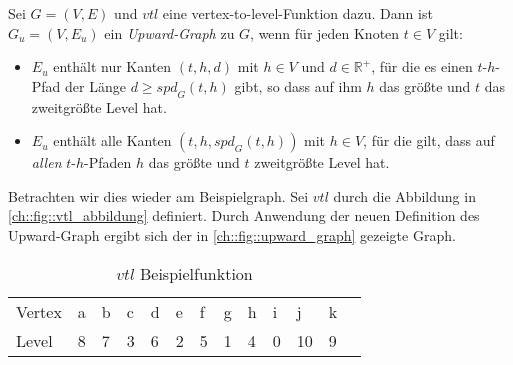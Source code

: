 \begin{definition}\label{people:def:upward_graph}
  Sei $G = (V, E)$ und ${vtl}$ eine vertex-to-level-Funktion dazu.
  Dann ist $G_u = (V, E_u)$ ein \emph{Upward-Graph} zu $G$, wenn für jeden Knoten $t \in V$ gilt:

  \begin{itemize}
    \item
          $E_u$ enthält nur Kanten $(t, h, d)$ mit $h \in V$ und $d \in \mathbb{R}^+$, für die es einen $t$-$h$-Pfad der Länge $d \geq {spd}_G (t, h)$ gibt, so dass auf ihm $h$ das größte und $t$ das zweitgrößte Level hat.

    \item
          $E_u$ enthält alle Kanten $(t, h, {spd}_G (t, h))$ mit $h \in V$, für die gilt, dass auf \emph{allen} $t$-$h$-Pfaden $h$ das größte und $t$ zweitgrößte Level hat.
  \end{itemize}
\end{definition}

Betrachten wir dies wieder am Beispielgraph.
Sei ${vtl}$ durch die Abbildung in \autoref{ch::fig::vtl_abbildung} definiert.
Durch Anwendung der neuen Definition des Upward-Graph ergibt sich der in \autoref{ch::fig::upward_graph} gezeigte Graph.

\begin{table}[ht]
  \centering
  \begin{tabular}{lllllllllllll}
    Vertex & a & b & c & d & e & f & g & h & i & j  & k & \\
    Level  & 8 & 7 & 3 & 6 & 2 & 5 & 1 & 4 & 0 & 10 & 9 &
  \end{tabular}
  \caption{${vtl}$ Beispielfunktion}
  \label{ch::fig::vtl_abbildung}
\end{table}

